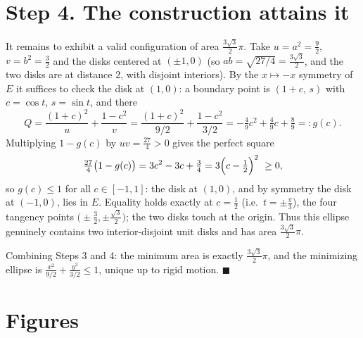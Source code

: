 \documentclass[11pt]{article}
\begin{document}
\section*{Step 4. The construction attains it}

It remains to exhibit a valid configuration of area $\tfrac{3\sqrt3}{2}\pi$. Take $u=a^2=\tfrac92$,
$v=b^2=\tfrac32$ and the disks centered at $(\pm1,0)$ (so $ab=\sqrt{27/4}=\tfrac{3\sqrt3}{2}$, and the
two disks are at distance $2$, with disjoint interiors). By the $x\mapsto-x$ symmetry of $E$ it
suffices to check the disk at $(1,0)$: a boundary point is $(1+c,\,s)$ with $c=\cos t$, $s=\sin t$,
and there
\[
  Q=\frac{(1+c)^2}{u}+\frac{1-c^2}{v}
   =\frac{(1+c)^2}{9/2}+\frac{1-c^2}{3/2}
   =-\tfrac49c^2+\tfrac49c+\tfrac89=:g(c).
\]
Multiplying $1-g(c)$ by $uv=\tfrac{27}{4}>0$ gives the perfect square
\[
  \tfrac{27}{4}\bigl(1-g(c)\bigr)=3c^2-3c+\tfrac34=3\Bigl(c-\tfrac12\Bigr)^2\ \ge0,
\]
so $g(c)\le1$ for all $c\in[-1,1]$: the disk at $(1,0)$, and by symmetry the disk at $(-1,0)$, lies
in $E$. Equality holds exactly at $c=\tfrac12$ (i.e.\ $t=\pm\tfrac\pi3$), the four tangency points
$\bigl(\pm\tfrac32,\pm\tfrac{\sqrt3}{2}\bigr)$; the two disks touch at the origin. Thus this ellipse
genuinely contains two interior-disjoint unit disks and has area $\tfrac{3\sqrt3}{2}\pi$.

Combining Steps 3 and 4: the minimum area is exactly $\tfrac{3\sqrt3}{2}\pi$, and the minimizing
ellipse is $\tfrac{x^2}{9/2}+\tfrac{y^2}{3/2}\le1$, unique up to rigid motion. $\blacksquare$

\section*{Figures}

\begin{center}
\end{center}
\end{document}

